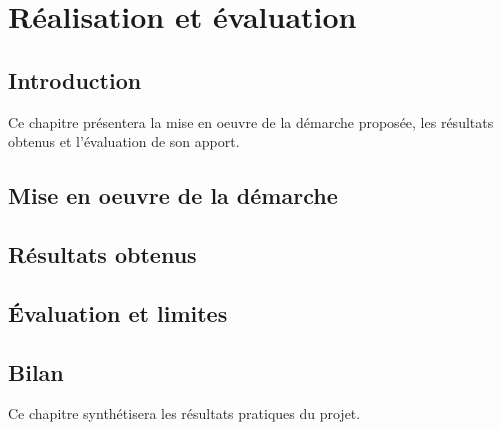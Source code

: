 \chapter{Réalisation et évaluation}
\clearpage

\section{Introduction}

Ce chapitre présentera la mise en oeuvre de la démarche proposée, les résultats obtenus et l'évaluation de son apport.

\section{Mise en oeuvre de la démarche}


\section{Résultats obtenus}


\section{Évaluation et limites}


\section{Bilan}

Ce chapitre synthétisera les résultats pratiques du projet.

\clearpage
